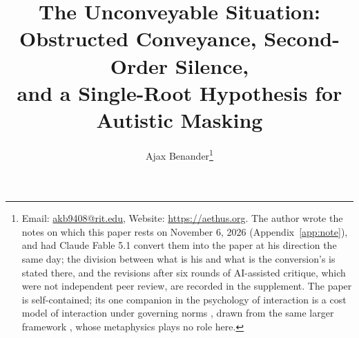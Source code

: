 \title{The Unconveyable Situation:\\ \large Obstructed Conveyance, Second-Order Silence,\\ \large and a Single-Root Hypothesis for Autistic Masking}
\author{Ajax Benander\thanks{Email: \href{mailto:akb9408@rit.edu}{akb9408@rit.edu}, Website: \url{https://aethus.org}. The author wrote the notes on which this paper rests on November 6, 2026 (Appendix~\ref{app:note}), and had Claude Fable 5.1 convert them into the paper at his direction the same day; the division between what is his and what is the conversion's is stated there, and the revisions after six rounds of AI-assisted critique, which were not independent peer review, are recorded in the supplement. The paper is self-contained; its one companion in the psychology of interaction is a cost model of interaction under governing norms \cite{NormCost}, drawn from the same larger framework \cite{Aethus}, whose metaphysics plays no role here.}}
